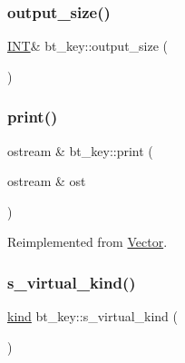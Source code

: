 \mbox{\label{classbt__key_acb48f95d030f62c56051d0cd6e013394}} 
\subsubsection{\texorpdfstring{output\+\_\+size()}{output\_size()}}
{\footnotesize\ttfamily \mbox{\hyperlink{galois_8h_a09fddde158a3a20bd2dcadb609de11dc}{I\+NT}}\& bt\+\_\+key\+::output\+\_\+size (\begin{DoxyParamCaption}{ }\end{DoxyParamCaption})\hspace{0.3cm}{\ttfamily [inline]}}

\mbox{\label{classbt__key_aee0bad4deaf27c20d15d97050d3af150}} 
\subsubsection{\texorpdfstring{print()}{print()}}
{\footnotesize\ttfamily ostream \& bt\+\_\+key\+::print (\begin{DoxyParamCaption}\item[{ostream \&}]{ost }\end{DoxyParamCaption})\hspace{0.3cm}{\ttfamily [virtual]}}



Reimplemented from \mbox{\hyperlink{class_vector_a71d7e24bcfdfc69d4a2137360acb066c}{Vector}}.

\mbox{\label{classbt__key_a53b7441523674e20f5c8f5c81eaccad4}} 
\subsubsection{\texorpdfstring{s\+\_\+virtual\+\_\+kind()}{s\_virtual\_kind()}}
{\footnotesize\ttfamily \mbox{\hyperlink{discreta_8h_aaf25ee7e2306d78c74ec7bc48f092e81}{kind}} bt\+\_\+key\+::s\+\_\+virtual\+\_\+kind (\begin{DoxyParamCaption}{ }\end{DoxyParamCaption})\hspace{0.3cm}{\ttfamily [virtual]}}



